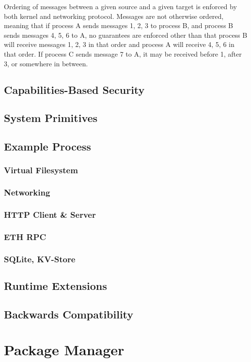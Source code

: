 \documentclass[runningheads]{llncs}
\begin{document}
Ordering of messages between a given source and a given target is enforced by both kernel and networking protocol.
Messages are not otherwise ordered, meaning that if process A sends messages 1, 2, 3 to process B, and process B sends messages 4, 5, 6 to A, no guarantees are enforced other than that process B will receive messages 1, 2, 3 in that order and process A will receive 4, 5, 6 in that order.
If process C sends message 7 to A, it may be received before 1, after 3, or somewhere in between.



\subsection{Capabilities-Based Security}
\subsection{System Primitives}
\subsection{Example Process}
\subsubsection{Virtual Filesystem}
\subsubsection{Networking}
\subsubsection{HTTP Client \& Server}
\subsubsection{ETH RPC}
\subsubsection{SQLite, KV-Store}
\subsection{Runtime Extensions}
\subsection{Backwards Compatibility}
%
%
%
\section{Package Manager}
\end{document}
